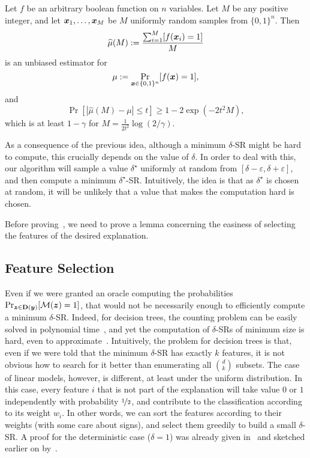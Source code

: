 \begin{fact}\label{fact:hoeffding}
    Let $f$ be an arbitrary boolean function on $n$ variables. Let $M$ be any positive integer,
    and let ${\bm{x}}_1, \ldots, {\bm{x}}_M$ be $M$ uniformly random samples from $\{0, 1\}^n$. Then 
    \[
        \widehat{\mu}(M) := \frac{\sum_{i=1}^M [f({\bm{x}}_i) = 1]}{M}
    \]
    is an unbiased estimator for 
    \[
        \mu := \Pr_{{\bm{x}} \in \{0, 1\}^n}[f({\bm{x}}) = 1],
    \]
    and 
    \[
    \Pr[\left|\widehat{\mu}(M) - \mu \right| \leq t] \geq 1 - 2\exp(-2t^2 M),
    \]
    which is at least $1 - \gamma$ for $M = \frac{1}{2t^2} \log(2/\gamma)$.
\end{fact}

As a consequence of the previous idea, although a minimum $\delta$-SR might be hard to compute, this crucially depends on the value of $\delta$. In order to deal with this, our algorithm will sample a value $\delta^\star$ uniformly at random from $[\delta-\varepsilon, \delta+\varepsilon]$, and then compute a minimum $\delta^\star$-SR. Intuitively, the idea is that as $\delta^\star$ is chosen at random, it will be unlikely that a value that makes the computation hard is chosen. 

Before proving~, we need to prove a lemma concerning the easiness of selecting the features of the desired explanation.

\subsection{Feature Selection}

Even if we were granted an oracle computing the probabilities
\(
    \Pr_{{\bm{z}}  \in \mathbf{D}({\bm{y}})}[\mathcal{M}({\bm{z}}) = 1]
\), that would not be necessarily enough to efficiently compute a minimum $\delta$-SR. Indeed, for decision trees, the counting problem can be easily solved in polynomial time~\citep{NEURIPS2020_b1adda14}, and yet the computation of $\delta$-SRs of minimum size is hard, even to approximate~\citep{NEURIPS2022_b8963f6a, Kozachinskiy_2023}.
Intuitively, the problem for decision trees is that, even if we were told that the minimum $\delta$-SR has exactly $k$ features, it is not obvious how to search for it better than enumerating all $\binom{d}{k}$ subsets. The case of linear models, however, is different, at least under the uniform distribution. In this case, every feature $i$ that is not part of the explanation will take value $0$ or $1$ independently with probability $\nicefrac{1}{2}$, and contribute to the classification according to its weight $w_i$. In other words, we can sort the features according to their weights (with some care about signs), and select them greedily to build a small $\delta$-SR. A proof for the deterministic case ($\delta = 1$) was already given in~\cite{NEURIPS2020_b1adda14} and sketched earlier on by~\cite{ExplainingNaiveBayes}.

